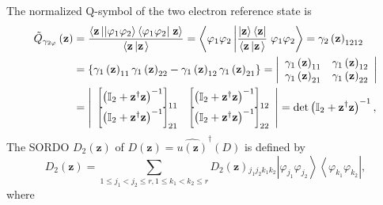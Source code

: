 \documentclass[aps,preprint]{revtex4}%
\begin{document}
The normalized Q-symbol of the two electron reference state is
\begin{align}
\tilde{Q}_{\gamma_{2\varphi}}\left(  \mathbf{z}\right)   &  =\frac
{\left\langle \mathbf{z}\left\vert \left\vert \varphi_{1}\varphi
_{2}\right\rangle \left\langle \varphi_{1}\varphi_{2}\right\vert \right.
\mathbf{z}\right\rangle }{\left\langle \mathbf{z\left\vert \mathbf{z}\right.
}\right\rangle }=\left\langle \varphi_{1}\varphi_{2}\left\vert \frac
{\left\vert \mathbf{z}\right\rangle \left\langle \mathbf{z}\right\vert
}{\left\langle \mathbf{z\left\vert \mathbf{z}\right.  }\right\rangle }\right.
\varphi_{1}\varphi_{2}\right\rangle =\gamma_{2}\left(  \mathbf{z}\right)
_{1212}\nonumber\\
&  =\left\{  \gamma_{1}\left(  \mathbf{z}\right)  _{11}\gamma_{1}\left(
\mathbf{z}\right)  _{22}-\gamma_{1}\left(  \mathbf{z}\right)  _{12}\gamma
_{1}\left(  \mathbf{z}\right)  _{21}\right\}  =\left\vert
\begin{array}
[c]{cc}%
\gamma_{1}\left(  \mathbf{z}\right)  _{11} & \gamma_{1}\left(  \mathbf{z}%
\right)  _{12}\\
\gamma_{1}\left(  \mathbf{z}\right)  _{21} & \gamma_{1}\left(  \mathbf{z}%
\right)  _{22}%
\end{array}
\right\vert \nonumber\\
&  =\left\vert
\begin{array}
[c]{cc}%
\left[  \left(  \mathbb{I}_{2}+\mathbf{z}^{\dagger}\mathbf{z}\right)
^{-1}\right]  _{11} & \left[  \left(  \mathbb{I}_{2}+\mathbf{z}^{\dagger
}\mathbf{z}\right)  ^{-1}\right]  _{12}\\
\left[  \left(  \mathbb{I}_{2}+\mathbf{z}^{\dagger}\mathbf{z}\right)
^{-1}\right]  _{21} & \left[  \left(  \mathbb{I}_{2}+\mathbf{z}^{\dagger
}\mathbf{z}\right)  ^{-1}\right]  _{22}%
\end{array}
\right\vert =\det\left(  \mathbb{I}_{2}+\mathbf{z}^{\dagger}\mathbf{z}\right)
^{-1},
\end{align}
The SORDO $D_{2}\left(  \mathbf{z}\right)  $ of $D\left(  \mathbf{z}\right)
=\widehat{u\left(  \mathbf{z}\right)  }^{\dagger}\left(  D\right)  $ is
defined by%
\begin{equation}
D_{2}\left(  \mathbf{z}\right)  =\sum_{1\leq j_{1}<j_{2}\leq r,1\leq
k_{1}<k_{2}\leq r}D_{2}\left(  \mathbf{z}\right)  {}_{j_{1}j_{2}k_{1}k_{2}%
}\left\vert \varphi_{j_{1}}\varphi_{j_{2}}\right\rangle \left\langle
\varphi_{k_{1}}\varphi_{k_{2}}\right\vert ,
\end{equation}
where%
\end{document}
